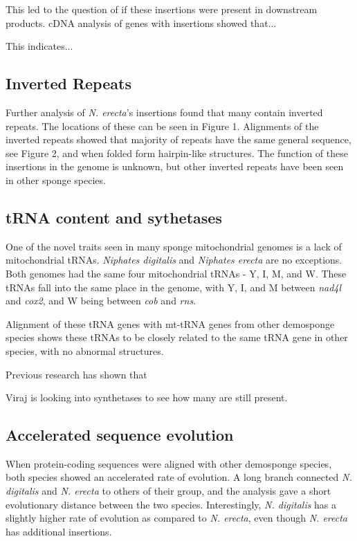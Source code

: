 \documentclass[../main.tex]{subfiles}
\begin{document}
This led to the question of if these insertions were present in downstream products. cDNA analysis of genes with insertions showed that...

This indicates...

\subsection{Inverted Repeats}

Further analysis of \emph{N. erecta}'s insertions found that many contain inverted repeats. The locations of these can be seen in Figure 1. Alignments of the inverted repeats showed that majority of repeats have the same general sequence, see Figure 2, and when folded form hairpin-like structures. The function of these insertions in the genome is unknown, but other inverted repeats have been seen in other sponge species. 

\subsection{tRNA content and sythetases}
One of the novel traits seen in many sponge mitochondrial genomes is a lack of mitochondrial tRNAs. \emph{Niphates digitalis} and \emph{Niphates erecta} are no exceptions. Both genomes had the same four mitochondrial tRNAs - Y, I, M, and W. These tRNAs fall into the same place in the genome, with Y, I, and M between \emph{nad4l} and \emph{cox2}, and W being between \emph{cob} and \emph{rns}.

Alignment of these tRNA genes with mt-tRNA genes from other demosponge species shows these tRNAs to be closely related to the same tRNA gene in other species, with no abnormal structures. 

Previous research has shown that 

Viraj is looking into synthetases to see how many are still present.

\subsection{Accelerated sequence evolution}
When protein-coding sequences were aligned with other demosponge species, both species showed an accelerated rate of evolution. A long branch connected \emph{N. digitalis} and \emph{N. erecta} to others of their group, and the analysis gave a short evolutionary distance between the two species. Interestingly, \emph{N. digitalis} has a slightly higher rate of evolution as compared to \emph{N. erecta}, even though \emph{N. erecta} has additional insertions.
\end{document}
